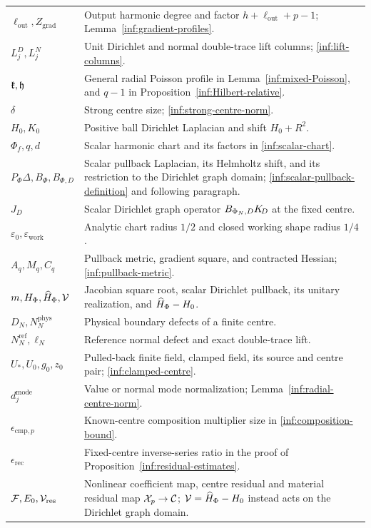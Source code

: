 \begin{longtable}{@{}>{\raggedright\arraybackslash}p{}>{\raggedright\arraybackslash}p{}@{}}
$\ell_{\mathrm{out}},Z_{\mathrm{grad}}$ & Output harmonic degree and factor $h+\ell_{\mathrm{out}}+p-1$; Lemma~\ref{inf:gradient-profiles}.\\
$L_j^D,L_j^N$ & Unit Dirichlet and normal double-trace lift columns; \eqref{inf:lift-columns}.\\
$\mathfrak{k},\mathfrak h$ & General radial Poisson profile in Lemma~\ref{inf:mixed-Poisson}, and $q-1$ in Proposition~\ref{inf:Hilbert-relative}.\\
$\delta$ & Strong centre size; \eqref{inf:strong-centre-norm}.\\
$H_0,K_0$ & Positive ball Dirichlet Laplacian and shift $H_0+R^2$.\\
$\Phi_f,q,d$ & Scalar harmonic chart and its factors in \eqref{inf:scalar-chart}.\\
$P_\Phi\Delta,B_\Phi,B_{\Phi,D}$ & Scalar pullback Laplacian, its Helmholtz shift, and its restriction to the Dirichlet graph domain; \eqref{inf:scalar-pullback-definition} and following paragraph.\\
$J_D$ & Scalar Dirichlet graph operator $B_{\Phi_N,D}K_{\!D}$ at the fixed centre.\\
$\varepsilon_0,\varepsilon_{\mathrm{work}}$ & Analytic chart radius $1/2$ and closed working shape radius $1/4$.\\
$A_q,M_q,C_q$ & Pullback metric, gradient square, and contracted Hessian; \eqref{inf:pullback-metric}.\\
$m,H_\Phi,\widehat H_\Phi,\mathcal V$ & Jacobian square root, scalar Dirichlet pullback, its unitary realization, and $\widehat H_\Phi-H_0$.\\
$D_N,N_N^{\mathrm{phys}}$ & Physical boundary defects of a finite centre.\\
$N_N^{\mathrm{ref}},\ell_N$ & Reference normal defect and exact double-trace lift.\\
$U_*,U_0,g_0,z_0$ & Pulled-back finite field, clamped field, its source and centre pair; \eqref{inf:clamped-centre}.\\
$d_j^{\mathrm{mode}}$ & Value or normal mode normalization; Lemma~\ref{inf:radial-centre-norm}.\\
$\epsilon_{\mathrm{cmp},p}$ & Known-centre composition multiplier size in \eqref{inf:composition-bound}.\\
$\epsilon_{\mathrm{rec}}$ & Fixed-centre inverse-series ratio in the proof of Proposition~\ref{inf:residual-estimates}.\\
$\mathcal F,E_0,\mathcal V_{\mathrm{res}}$ & Nonlinear coefficient map, centre residual and material residual map $\mathcal X_p\to\mathcal C$; $\mathcal V=\widehat H_\Phi-H_0$ instead acts on the Dirichlet graph domain.\\

\end{longtable}

